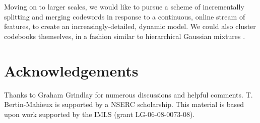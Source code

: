 \documentclass{article}
\begin{document}
Moving on to larger scales, we would like to pursue a scheme of incrementally 
splitting and merging codewords in response to a continuous, online stream 
of features, to create an increasingly-detailed, dynamic model.  We could
also cluster codebooks themselves, in a fashion similar to hierarchical
Gaussian mixtures \cite{Vasconcelos2001}.


\section{Acknowledgements}
Thanks to Graham Grindlay for numerous discussions and helpful comments.
T. Bertin-Mahieux is supported by a NSERC scholarship.
This material is based upon work supported by the IMLS (grant LG-06-08-0073-08).



\small

\end{document}
